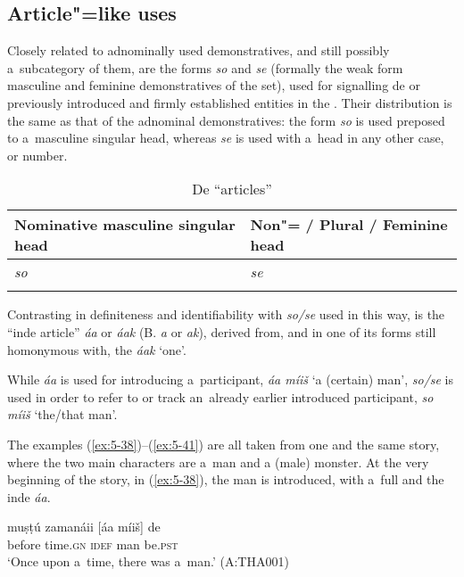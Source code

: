 \subsection{Article"=like uses}
\label{subsec:5-2-6}

Closely related to adnominally used demonstratives, and still possibly a~subcategory of them, are the forms \textit{so} and \textit{se} (formally the weak form masculine and feminine  demonstratives of the  set), used for signalling de or previously introduced and firmly established entities in the . Their distribution is the same as that of the adnominal demonstratives: the form \textit{so} is used preposed to a~masculine singular  head, whereas \textit{se} is used with a~head in any other case,  or number. 


\begin{table}[ht]
 \caption{De ``articles''}
\begin{tabularx}{\textwidth}{ Q Q }
\lsptoprule
Nominative masculine singular head &
Non"= / Plural / Feminine head\\\hline
\textit{so} &
\textit{se} \\\lspbottomrule
\end{tabularx}
\label{tab:5-5}
\end{table}

Contrasting in definiteness and identifiability with \textit{so/se} used in this way, is the ``inde article'' \textit{áa} or \textit{áak} (B. \textit{a} or \textit{ak}), derived from, and in one of its forms still homonymous with, the  \textit{áak} `one'.

While \textit{áa} is used for introducing a~participant, \textit{áa míiš} `a (certain) man', \textit{so/se} is used in order to refer to or track an~already earlier introduced participant, \textit{so míiš} `the/that man'.


  The examples (\ref{ex:5-38})--(\ref{ex:5-41}) are all taken from one and the same story, where the
  two main characters are a~man and a (male) monster. At the very beginning of the story, in
  (\ref{ex:5-38}), the man is introduced, with a~full  and the inde \textit{áa}.

\begin{exe}
\ex
\label{ex:5-38}
\gll muṣṭú zamanáii [áa míiš] de\\
before time.\textsc{gn} \textsc{idef} man be.\textsc{pst}\\
\glt `Once upon a~time, there was a~man.' (A:THA001)
\end{exe}

